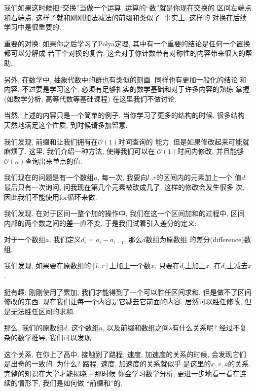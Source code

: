 我们如果这时候把``交换''当做一个运算, 运算的``数''就是你现在交换的
区间左端点和右端点, 这样子就和刚刚加法减法的前缀和类似了. 事实上, 这样的
对换在后续学习中是很重要的. 

\begin{remark}
    重要的对换: 如果你之后学习了Polya定理, 其中有一个重要的结论是任何一个置换都可以分解成
    若干个对换的复合. 这会对于你计数带有对称性的内容带来很大的帮助. 
    
    另外, 在数学中, 抽象代数中的群也有类似的刻画. 同样也有更加一般化的结论
    和内容. 不过要是学习这个, 必须有足够扎实的数学基础和对于许多内容的熟练
    掌握(如数学分析, 高等代数等基础课程)
    在这里我们不做讨论. 
\end{remark}

当然, 上述的内容只是一个简单的例子. 当你学习了更多的结构的时候, 很多结构
天然地满足这个性质. 到时候请多加留意. 

 我们发现, 前缀和让我们拥有在$\mathcal O(1)$时间查询的
能力. 但是如果修改起来可能就麻烦了. 这里, 我们介绍一种方法, 使得我们可以在
$\mathcal O(1)$时间内修改, 并且能够$\mathcal O(n)$查询出来单点的值. 

我们现在的问题是有一个数组$a$, 每一次, 我要向$l..r$的区间内的元素加上一个
值$d$. 最后只有一次询问, 问我现在第几个元素被改成几了. 这样的修改会发生很多
次, 因此我们不能使用for循环来做. 

我们发现, 在对于区间一整个加的操作中, 我们在这一个区间加和的过程中, 区间
内部的两个数之间的\textbf{差}一直不变. 于是我们试着引入差分的定义: 

\begin{definition}
    对于一个数组$a$, 我们定义$d_i=a_i-a_{i-1}$, 那么$d$数组为原数组
    的差分(difference)数组. 
\end{definition}

我们发现, 如果要在原数组的$[l..r]$上加上一个数$x$, 只要在$d_l$上加上$x$, 
在$d_r$上减去$x$. 

挺有趣: 刚刚使用了累加, 我们才能得到了一个可以胜任区间求和, 但是做不了区间
修改的东西. 现在我们让每一个内容是它减去它前面的内容, 居然可以胜任修改, 
但是无法胜任区间的求和. 

那么, 我们的原数组$d$, 这个数组$a$, 以及前缀和数组之间$s$有什么关系呢? 
经过不复杂的数学推导, 我们可以发现: 


\begin{remark}
    这个关系, 在你上了高中, 接触到了路程, 速度, 加速度的关系的时候, 
    会发现它们是出奇的一致的. 为什么? 路程, 速度, 加速度的关系就似乎
    是这里的$x, v,a$的关系. 完整的知识在大学才能揭晓 -- 那时候
    你会学习数学分析, 更进一步地看一看在连续的情形下, 我们是如何做
    ``前缀和''的. 
\end{remark}

